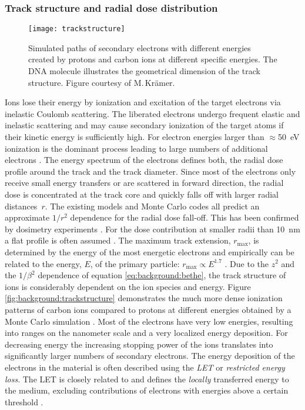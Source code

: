 \subsubsection{Track structure and radial dose distribution}
%
%
\begin{figure}[p]
  \centering
  \texttt{[image: trackstructure]}
  \caption[Simulated secondary electron paths created by protons and
  carbon ions at different energies.]{ Simulated paths of secondary
    electrons with different energies created by protons and carbon
    ions at different specific energies. The \acs{DNA} molecule 
    illustrates the geometrical dimension of the track structure.
    Figure courtesy of M.\,Kr\"amer.}
  \label{fig:background:trackstructure}
\end{figure}
Ions lose their energy by ionization and excitation of the target
electrons via inelastic Coulomb scattering. The liberated electrons
undergo frequent elastic and inelastic scattering and may cause
secondary ionization of the target atoms if their kinetic energy is
sufficiently high. For electron energies larger than
$\approx$\SI{50}{\electronvolt} ionization is the dominant process
leading to large numbers of additional electrons
\citep{Kraft2000,Schardt2010}. The energy spectrum of the electrons
defines both, the radial dose profile around the track and the track
diameter. Since most of the electrons only receive small energy
transfers or are scattered in forward direction, the radial dose is
concentrated at the track core and quickly falls off with larger
radial distances~$r$. The existing models
\citep{Chatterjee1976,Katz1999} and Monte Carlo codes
\citep{Paretzke1986,Kraemer1995} all predict an approximate $1/r^2$
dependence for the radial dose fall-off. This has been confirmed by
dosimetry experiments \citep{Varma1977}. For the dose contribution at
smaller radii than \SI{10}{\nano\meter} a flat profile is often
assumed \citep{Scholz1996}. The maximum track extension,
$r_\text{max}$, is determined by the energy of the most energetic
electrons and empirically can be related to the energy, $E$, of the
primary particle: $r_\text{max}\propto E^{1.7}$
\citep{Kiefer1986}. Due to the $z^2$ and the $1/\beta^2$ dependence of
equation \eqref{eq:background:bethe}, the track structure of ions is
considerably dependent on the ion species and energy. Figure
\vref{fig:background:trackstructure} demonstrates the much more
dense ionization patterns of carbon ions compared to protons at
different energies obtained by a Monte Carlo simulation
\citep{Kraemer2010}. Most of the electrons have very low energies,
resulting into ranges on the nanometer scale and a very localized
energy deposition. For decreasing energy the increasing stopping power
of the ions translates into significantly larger numbers of secondary
electrons. The energy deposition of the electrons in the material is
often described using the \emph{\ac{LET}} or \emph{restricted energy
  loss}. The \ac{LET} is closely related to \dEdxt and defines the
\emph{locally} transferred energy to the medium, excluding
contributions of electrons with energies above a certain threshold
\citep{ICRU37,Nakamura2010}.



